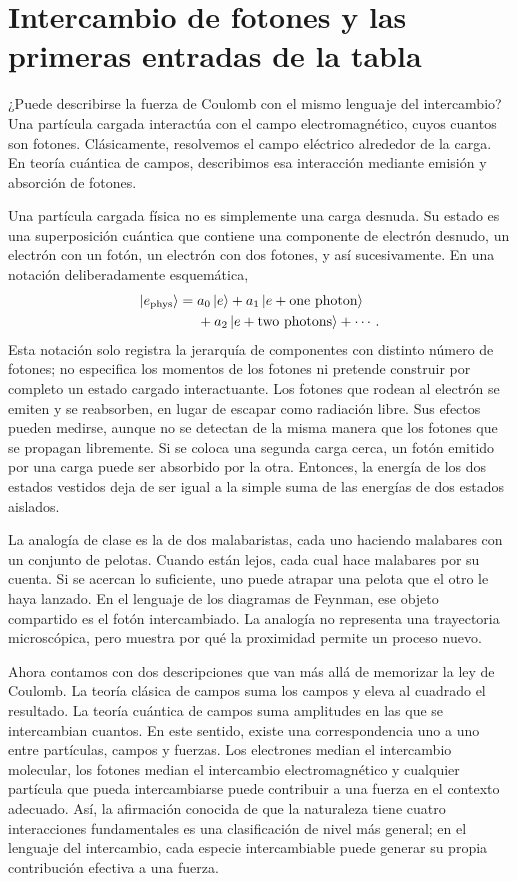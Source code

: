 \section{Intercambio de fotones y las primeras entradas de la tabla}

¿Puede describirse la fuerza de Coulomb con el mismo lenguaje del intercambio? Una partícula cargada interactúa con el campo electromagnético, cuyos cuantos son fotones. Clásicamente, resolvemos el campo eléctrico alrededor de la carga. En teoría cuántica de campos, describimos esa interacción mediante emisión y absorción de fotones.

Una partícula cargada física no es simplemente una carga desnuda. Su estado es una superposición cuántica que contiene una componente de electrón desnudo, un electrón con un fotón, un electrón con dos fotones, y así sucesivamente. En una notación deliberadamente esquemática,
\begin{equation}
\begin{aligned}
\left\lvert e_{\mathrm{phys}}\right\rangle
={}&a_0\left\lvert e\right\rangle
+a_1\left\lvert e+\text{one photon}\right\rangle
\\
&+a_2\left\lvert e+\text{two photons}\right\rangle+\cdots .
\end{aligned}
\end{equation}
Esta notación solo registra la jerarquía de componentes con distinto número de fotones; no especifica los momentos de los fotones ni pretende construir por completo un estado cargado interactuante.
Los fotones que rodean al electrón se emiten y se reabsorben, en lugar de escapar como radiación libre. Sus efectos pueden medirse, aunque no se detectan de la misma manera que los fotones que se propagan libremente. Si se coloca una segunda carga cerca, un fotón emitido por una carga puede ser absorbido por la otra. Entonces, la energía de los dos estados vestidos deja de ser igual a la simple suma de las energías de dos estados aislados.

La analogía de clase es la de dos malabaristas, cada uno haciendo malabares con un conjunto de pelotas. Cuando están lejos, cada cual hace malabares por su cuenta. Si se acercan lo suficiente, uno puede atrapar una pelota que el otro le haya lanzado. En el lenguaje de los diagramas de Feynman, ese objeto compartido es el fotón intercambiado. La analogía no representa una trayectoria microscópica, pero muestra por qué la proximidad permite un proceso nuevo.

Ahora contamos con dos descripciones que van más allá de memorizar la ley de Coulomb. La teoría clásica de campos suma los campos y eleva al cuadrado el resultado. La teoría cuántica de campos suma amplitudes en las que se intercambian cuantos. En este sentido, existe una correspondencia uno a uno entre partículas, campos y fuerzas. Los electrones median el intercambio molecular, los fotones median el intercambio electromagnético y cualquier partícula que pueda intercambiarse puede contribuir a una fuerza en el contexto adecuado. Así, la afirmación conocida de que la naturaleza tiene cuatro interacciones fundamentales es una clasificación de nivel más general; en el lenguaje del intercambio, cada especie intercambiable puede generar su propia contribución efectiva a una fuerza.

